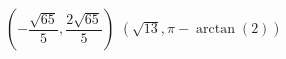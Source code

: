{ $\left(-\dfrac{\sqrt{65}}{5}, \dfrac{2\sqrt{65}}{5}\right)$ \label{recttopolarlast}}
{ $\left(\sqrt{13}, \pi - \arctan(2) \right)$}
